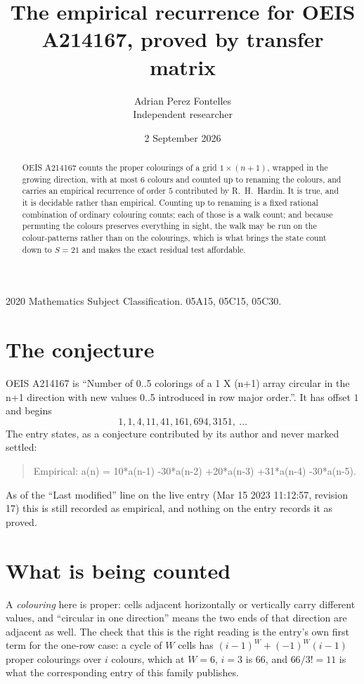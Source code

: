 \documentclass[11pt,a4paper]{article}
\title{The empirical recurrence for OEIS A214167, proved by transfer matrix}
\author{Adrian Perez Fontelles\\ \small Independent researcher}
\date{2 September 2026}
\theoremstyle{plain}
\theoremstyle{definition}
\begin{document}
\maketitle

\begin{abstract}
OEIS A214167 counts the proper colourings of a grid $1\times(n+1)$, wrapped in the growing direction, with at most $6$ colours and
counted up to renaming the colours, and carries an empirical recurrence of order $5$
contributed by R.~H.~Hardin. It is true, and it is decidable rather than empirical. Counting
up to renaming is a fixed rational combination of ordinary colouring counts; each of those is
a walk count; and because permuting the colours preserves everything in sight, the walk may be
run on the colour-patterns rather than on the colourings, which is what brings the state count
down to $S=21$ and makes the exact residual test affordable.
\end{abstract}

\noindent\small 2020 Mathematics Subject Classification. 05A15, 05C15, 05C30.\normalsize

\section{The conjecture}

OEIS A214167 is ``Number of 0..5 colorings of a 1 X (n+1) array circular in the n+1 direction with new values 0..5 introduced in row major order.''. It has offset $1$ and begins
\[
1, 1, 4, 11, 41, 161, 694, 3151,\ \dots
\]
The entry states, as a conjecture contributed by its author and never marked settled:
\begin{quote}
Empirical: a(n) = 10*a(n-1) -30*a(n-2) +20*a(n-3) +31*a(n-4) -30*a(n-5).
\end{quote}
As of the ``Last modified'' line on the live entry (Mar 15 2023 11:12:57, revision 17) this is still
recorded as empirical, and nothing on the entry records it as proved.

\section{What is being counted}

A \emph{colouring} here is proper: cells adjacent horizontally or vertically carry different
values, and ``circular in one direction'' means the two ends of that direction are adjacent as
well. The check that this is the right reading is the entry's own first term for the
one-row case: a cycle of $W$ cells has $(i-1)^W+(-1)^W(i-1)$ proper colourings over $i$
colours, which at $W=6$, $i=3$ is $66$, and $66/3!=11$ is what the corresponding entry of this
family publishes.
\end{document}
